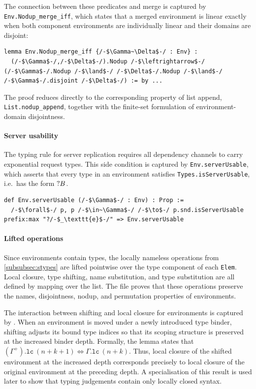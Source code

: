 The connection between these predicates and merge is captured by
\texttt{Env.Nodup\_merge\_iff}, which states that a merged environment is
linear exactly when both component environments are individually linear and
their domains are disjoint:

\begin{lstlisting}[language=Lean4]
lemma Env.Nodup_merge_iff {/-$\Gamma~\Delta$-/ : Env} :
  (/-$\Gamma$-/,/-$\Delta$-/).Nodup /-$\leftrightarrow$-/ (/-$\Gamma$-/.Nodup /-$\land$-/ /-$\Delta$-/.Nodup /-$\land$-/ /-$\Gamma$-/.disjoint /-$\Delta$-/) := by ...
\end{lstlisting}

The proof reduces directly to the corresponding property of list append,
\texttt{List.nodup\_append}, together with the finite-set formulation of
environment-domain disjointness.

\paragraph{Server usability} The typing rule for server replication requires all dependency channels to carry exponential request types. This side condition is captured by \texttt{Env.serverUsable}, which asserts that every type in an environment satisfies \texttt{Types.isServerUsable}, i.e.\ has the form {$\mathord{?} B$}.

\begin{lstlisting}[language=Lean4]
def Env.serverUsable (/-$\Gamma$-/ : Env) : Prop :=
  /-$\forall$-/ p, p /-$\in~\Gamma$-/ /-$\to$-/ p.snd.isServerUsable
prefix:max "?/-$_\texttt{e}$-/" => Env.serverUsable
\end{lstlisting}

\paragraph{Lifted operations} Since environments contain types, the locally nameless operations from \cref{subsubsec:stypes} are lifted pointwise over the type component of each \texttt{Elem}. Local closure, type shifting, name substitution, and type substitution are all defined by mapping over the list. The file  proves that these operations preserve the names, disjointness, nodup, and permutation properties of environments.

The interaction between shifting and local closure for environments is captured by . When an environment is moved under a newly introduced type binder, shifting adjusts its bound type indices so that its scoping structure is preserved at the increased binder depth. Formally, the lemma states that $(\Gamma^+).\texttt{lc}~(n + k + 1) \iff \Gamma.\texttt{lc}~(n + k)$. Thus, local closure of the shifted environment at the increased depth corresponds precisely to local closure of the original environment at the preceding depth. A specialisation of this result is used later to show that typing judgements contain only locally closed syntax.

